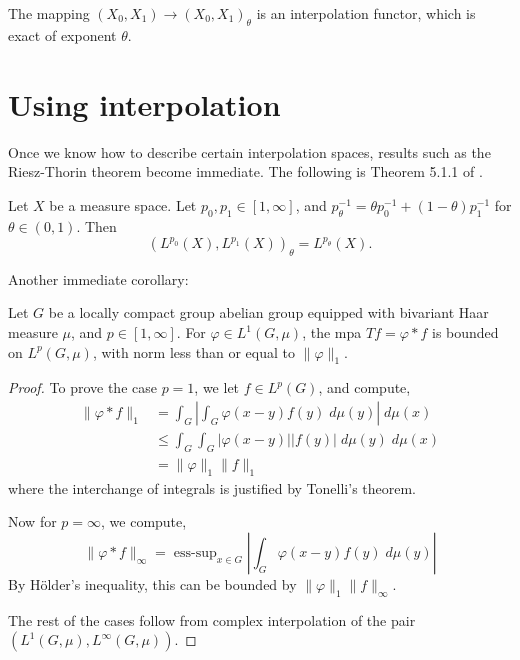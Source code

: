 \begin{proposition}
    The mapping $(X_0,X_1)\rightarrow (X_0,X_1)_\theta$ is an interpolation
    functor, which is exact of exponent $\theta$.
\end{proposition}

\section{Using interpolation}
Once we know how to describe certain interpolation spaces, results
such as the Riesz-Thorin theorem become immediate. The following
is Theorem 5.1.1 of \cite{interp}.
\begin{proposition}
    Let $X$ be a measure space.
    Let $p_0,p_1 \in [1,\infty]$, and $p_\theta^{-1} = \theta p_0^{-1}+(1-\theta)p_1^{-1}$
    for $\theta \in (0,1)$.
    Then
    \begin{equation*}
        (L^{p_0}(X),L^{p_1}(X))_\theta = L^{p_\theta}(X).
    \end{equation*}
\end{proposition}

Another immediate corollary:
\begin{proposition}
    Let $G$ be a locally compact group abelian group equipped
    with bivariant Haar measure $\mu$, and $p \in [1,\infty]$. For $\varphi \in L^1(G,\mu)$, the mpa
    $Tf = \varphi * f$ is bounded on $L^p(G,\mu)$, with norm less than or equal
    to $\|\varphi\|_1$.
\end{proposition}
\begin{proof}
    To prove the case $p = 1$, we let $f \in L^p(G)$, and compute,
    \begin{align*}
        \|\varphi * f\|_1 &= \int_G \left|\int_G\varphi(x-y)f(y)\;d\mu(y)\right|\;d\mu(x)\\
        &\leq \int_G \int_G |\varphi(x-y)||f(y)|\;d\mu(y)\;d\mu(x)\\
        &= \|\varphi\|_1\|f\|_1
    \end{align*}
    where the interchange of integrals is justified by Tonelli's theorem.
    
    Now for $p = \infty$, we compute,
    \begin{equation*}
        \|\varphi*f\|_\infty = \operatorname{ess-sup}_{x \in G} \left|\int_G \varphi(x-y)f(y)\;d\mu(y)\right|
    \end{equation*}
    By H\"older's inequality, this can be bounded by $\|\varphi\|_1\|f\|_\infty$.
    
    The rest of the cases
    follow from complex interpolation of the pair $(L^1(G,\mu),L^\infty(G,\mu))$.
\end{proof} 

